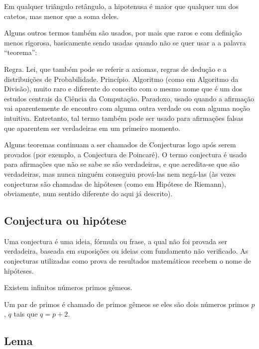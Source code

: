 \begin{UFSCcorolario}
    Em qualquer triângulo retângulo, a hipotenusa é maior que qualquer um dos
    catetos, mas menor que a soma deles. 
\end{UFSCcorolario}

Alguns outros termos também são usados, por mais que raros e com definição
menos rigorosa, basicamente sendo usadas quando não se quer usar a a palavra
``teorema'':

Regra.
Lei, que também pode se referir a axiomas, regras de dedução e a distribuições
de Probabilidade.
Princípio.
Algoritmo (como em Algoritmo da Divisão), muito raro e diferente do conceito
com o mesmo nome que é um dos estudos centrais da Ciência da Computação.
Paradoxo, usado quando a afirmação vai aparentemente de encontro com alguma
outra verdade ou com alguma noção intuitiva. Entretanto, tal termo também pode
ser usado para afirmações falsas que aparentem ser verdadeiras em um primeiro
momento. 

Alguns teoremas continuam a ser chamados de Conjecturas logo após serem
provados (por exemplo, a Conjectura de Poincaré). O termo conjectura é usado
para afirmações que não se sabe se são verdadeiras, e que acredita-se que são
verdadeiras, mas nunca ninguém conseguiu prová-las nem negá-las (às vezes
conjecturas são chamadas de hipóteses (como em Hipótese de Riemann),
obviamente, num sentido diferente do aqui já descrito). 

\subsection{Conjectura ou hipótese}

Uma conjectura é uma ideia, fórmula ou frase, a qual não foi provada ser
verdadeira, baseada em suposições ou ideias com fundamento não verificado. As
conjecturas utilizadas como prova de resultados matemáticos recebem o nome de
hipóteses. 

\begin{UFSCconjectura}
Existem infinitos números primos gêmeos. 
\end{UFSCconjectura}

Um par de primos é chamado de primos gêmeos se eles são dois números primos
$p$, $q$ tais que $q = p + 2$. 

\subsection{Lema}

